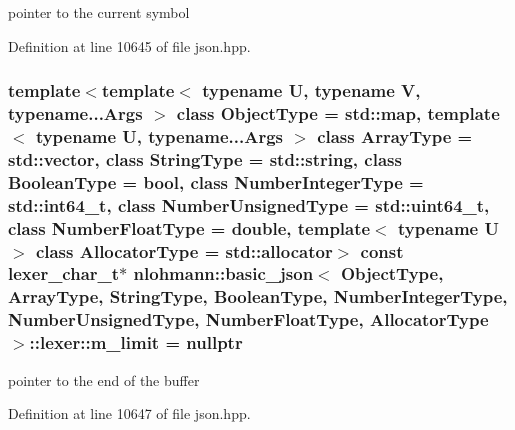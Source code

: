 pointer to the current symbol 



Definition at line 10645 of file json.\+hpp.

\hypertarget{classnlohmann_1_1basic__json_1_1lexer_ab9a9a6d80fcbed465af205f643df5376}{}
\subsubsection[{m\+\_\+limit}]{\setlength{\rightskip}{0pt plus 5cm}template$<$template$<$ typename U, typename V, typename...\+Args $>$ class Object\+Type = std\+::map, template$<$ typename U, typename...\+Args $>$ class Array\+Type = std\+::vector, class String\+Type  = std\+::string, class Boolean\+Type  = bool, class Number\+Integer\+Type  = std\+::int64\+\_\+t, class Number\+Unsigned\+Type  = std\+::uint64\+\_\+t, class Number\+Float\+Type  = double, template$<$ typename U $>$ class Allocator\+Type = std\+::allocator$>$ const {\bf lexer\+\_\+char\+\_\+t}$\ast$ {\bf nlohmann\+::basic\+\_\+json}$<$ Object\+Type, Array\+Type, String\+Type, Boolean\+Type, Number\+Integer\+Type, Number\+Unsigned\+Type, Number\+Float\+Type, Allocator\+Type $>$\+::lexer\+::m\+\_\+limit = nullptr\hspace{0.3cm}{\ttfamily [private]}}\label{classnlohmann_1_1basic__json_1_1lexer_ab9a9a6d80fcbed465af205f643df5376}


pointer to the end of the buffer 



Definition at line 10647 of file json.\+hpp.

\hypertarget{classnlohmann_1_1basic__json_1_1lexer_a1593a0456753134a4a558bb55cc21125}{}
